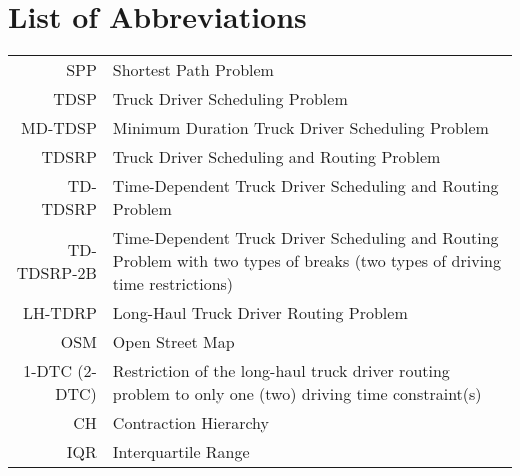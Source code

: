 

\appendix

{}	%
{}	%

\section{List of Abbreviations}
\label{app:abb}

\begin{tabular}{rp{}}
	SPP           & Shortest Path Problem                                                                                                        \\
	TDSP          & Truck Driver Scheduling Problem                                                                                              \\
	MD-TDSP       & Minimum Duration Truck Driver Scheduling Problem                                                                             \\
	TDSRP         & Truck Driver Scheduling and Routing Problem                                                                                  \\
	TD-TDSRP      & Time-Dependent Truck Driver Scheduling and Routing Problem                                                                   \\
	TD-TDSRP-2B   & Time-Dependent Truck Driver Scheduling and Routing Problem with two types of breaks (two types of driving time restrictions) \\
	LH-TDRP       & Long-Haul Truck Driver Routing Problem                                                                                       \\
	OSM           & Open Street Map                                                                                                              \\
	1-DTC (2-DTC) & Restriction of the long-haul truck driver routing problem to only one (two) driving time constraint(s)                       \\
	CH            & Contraction Hierarchy                                                                                                        \\
	IQR           & Interquartile Range
\end{tabular}



